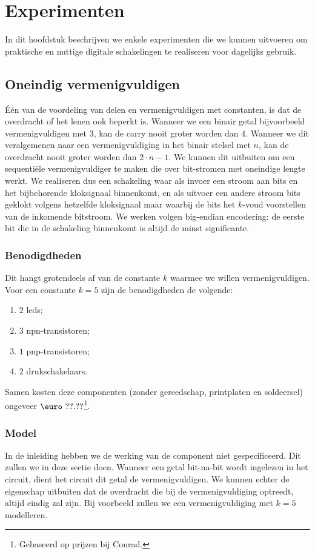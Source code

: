 \chapter{Experimenten}
\begin{chapterintro}
In dit hoofdstuk beschrijven we enkele experimenten die we kunnen uitvoeren om praktische en nuttige digitale schakelingen te realiseren voor dagelijks gebruik.
\end{chapterintro}
\minitoc[n]
\section{Oneindig vermenigvuldigen}
\'E\'en van de voordeling van delen en vermenigvuldigen met constanten, is dat de overdracht of het lenen ook beperkt is. Wanneer we een binair getal bijvoorbeeld vermenigvuldigen met $3$, kan de carry nooit groter worden dan $4$. Wanneer we dit veralgemenen naar een vermenigvuldiging in het binair stelsel met $n$, kan de overdracht nooit groter worden dan $2\cdot n-1$. We kunnen dit uitbuiten om een sequenti\"ele vermenigvuldiger te maken die over bit-stromen met oneindige lengte werkt. We realiseren dus een schakeling waar als invoer een stroom aan bits en het bijbehorende kloksignaal binnenkomt, en als uitvoer een andere stroom bits geklokt volgens hetzelfde kloksignaal maar waarbij de bits het $k$-voud voorstellen van de inkomende bitstroom. We werken volgen big-endian encodering: de eerste bit die in de schakeling binnenkomt is altijd de minst significante.
\subsection{Benodigdheden}
Dit hangt grotendeels af van de constante $k$ waarmee we willen vermenigvuldigen. Voor een constante $k=5$ zijn de benodigdheden de volgende:
\begin{enumerate}
 \item $2$ leds;
 \item $3$ npn-transistoren;
 \item $1$ pnp-transistoren;
 \item $2$ drukschakelaars.
\end{enumerate}
Samen kosten deze componenten (zonder gereedschap, printplaten en soldeersel) ongeveer $\mbox{\euro}\ ??.??$\footnote{Gebaseerd op prijzen bij Conrad.}.
\subsection{Model}
In de inleiding hebben we de werking van de component niet gespecificeerd. Dit zullen we in deze sectie doen. Wanneer een getal bit-na-bit wordt ingelezen in het circuit, dient het circuit dit getal de vermenigvuldigen. We kunnen echter de eigenschap uitbuiten dat de overdracht die bij de vermenigvuldiging optreedt, altijd eindig zal zijn. Bij voorbeeld zullen we een vermenigvuldiging met $k=5$ modelleren.
